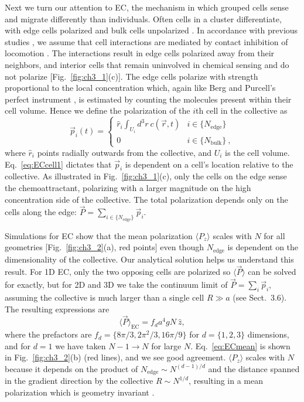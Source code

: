 Next we turn our attention to EC, the mechanism in which grouped cells sense and migrate differently than individuals.
Often cells in a cluster differentiate, with edge cells polarized and bulk cells unpolarized \cite{malet2015collective,cai2016modeling}. In accordance with previous studies \cite{camley2016emergent,varennes2016collective},
we assume that cell interactions are mediated by contact inhibition of locomotion \cite{mayor2010keeping}. The interactions result in edge cells polarized away from their neighbors, and interior cells that remain uninvolved in chemical sensing and do not polarize [Fig.\ \ref{fig:ch3_1}(c)]. The edge cells polarize with strength proportional to the local concentration which, again like Berg and Purcell's perfect instrument \cite{berg1977physics}, is estimated by counting the molecules present within their cell volume. Hence we define the polarization of the $i$th cell in the collective as
\begin{equation} \label{eq:ECcell1}
    \vec{p}_i(t) =
    \begin{cases}
         \hat{r}_i \int_{U_i} d^3r \ c(\vec{r},t) &i \in \{ N_\text{edge} \} \\
        0 &i \in \{ N_\text{bulk} \} \ ,
    \end{cases}
\end{equation}
where $\hat{r}_i$ points radially outwards from the collective, and $U_i$ is the cell volume. Eq.\ \ref{eq:ECcell1} dictates that $\vec{p}_i$ is dependent on a cell's location relative to the collective. As illustrated in Fig.\ \ref{fig:ch3_1}(c), only the cells on the edge sense the chemoattractant, polarizing with a larger magnitude on the high concentration side of the collective. The total polarization depends only on the cells along the edge:
$\vec{P} = \sum_{i \in \{N_\text{edge}\} } \vec{p}_i$.

Simulations for EC show that the mean polarization $\langle P_z \rangle$ scales with $N$ for all geometries [Fig.\ \ref{fig:ch3_2}(a), red points] even though $N_\text{edge}$ is dependent on the dimensionality of the collective. Our analytical solution helps us understand this result. For 1D EC, only the two opposing cells are polarized so $\langle\vec{P}\rangle$ can be solved for exactly, but for 2D and 3D we take the continuum limit of
$\vec{P} = \sum_i \vec{p}_i$,
assuming the collective is much larger than a single cell $R \gg a$ (see Sect.\ 3.6). The resulting expressions are
\begin{equation} \label{eq:ECmean}
    \langle \vec{P} \rangle_\text{EC} = f_d a^4gN \ \hat{z},
\end{equation}
where the prefactors are $f_d = \{8\pi/3, 2\pi^2/3, 16\pi/9\}$ for $d=\{1,2,3\}$ dimensions, and for $d=1$ we have taken $N-1\to N$ for large $N$. Eq.\ \ref{eq:ECmean} is shown in Fig.\ \ref{fig:ch3_2}(b) (red lines), and we see good agreement. $\langle P_z \rangle$ scales with $N$ because it depends on the product of
$N_\text{edge} \sim N^{(d-1)/d}$
and the distance spanned in the gradient direction by the collective
$R \sim N^{1/d}$,
resulting in a mean polarization which is geometry invariant \cite{malet2015collective}.

